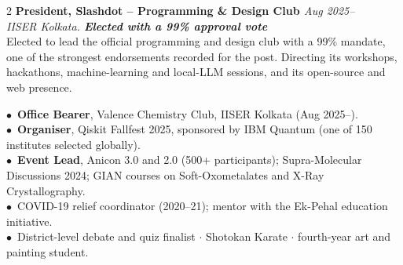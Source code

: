 \documentclass[a4paper,10.5pt]{extarticle}
\newcommand{\entryv}[4]{%
  {\normalsize\textbf{#1}}\hfill{\small\itshape\textcolor{mutedtext}{#2}}\\[0.04em]
  {\small\itshape\textcolor{mutedtext}{#3}}\\[0.04em]
  {\small #4}\par\vspace{3pt}%
}
\begin{document}
\begin{paracol}{2}
\entryv{President, Slashdot -- Programming \& Design Club \href{https://slashdot-iiserk.github.io/}{\faGlobe}}{Aug 2025--}{IISER Kolkata. \textbf{Elected with a 99\% approval vote}}{%
Elected to lead the official programming and design club with a 99\% mandate, one of the strongest endorsements recorded for the post. Directing its workshops, hackathons, machine-learning and local-LLM sessions, and its open-source and web presence.}

{\small
$\bullet$~\textbf{Office Bearer}, Valence Chemistry Club, IISER Kolkata (Aug 2025--).\\
$\bullet$~\textbf{Organiser}, Qiskit Fallfest 2025, sponsored by IBM Quantum (one of 150 institutes selected globally).\\
$\bullet$~\textbf{Event Lead}, Anicon 3.0 and 2.0 (500+ participants); Supra-Molecular Discussions 2024; GIAN courses on Soft-Oxometalates and X-Ray Crystallography.\\
$\bullet$~COVID-19 relief coordinator (2020--21); mentor with the Ek-Pehal education initiative.\\
$\bullet$~District-level debate and quiz finalist $\cdot$ Shotokan Karate $\cdot$ fourth-year art and painting student.
}

\end{paracol}
\end{document}
